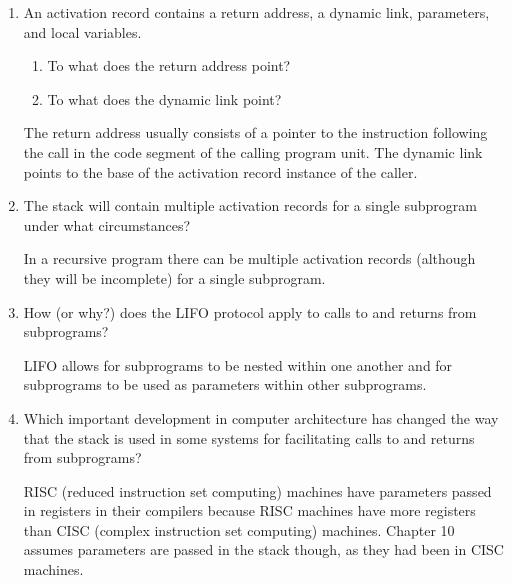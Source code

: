 \begin{enumerate}
\begin{answer}
\end{answer}

  \item An activation record contains a return
    address, a dynamic link, parameters, and
    local variables.
  \begin{enumerate}
    \item To what does the return address point?
    \item To what does the dynamic link point?
    \end{enumerate}
  
  \begin{answer}
  
    The return address usually consists of a pointer to the instruction following the call in the code segment of the calling program unit.  The dynamic link points to the base of the activation record instance of the caller.
    
\end{answer}


  \item The stack will contain multiple activation
    records for a single subprogram under what
    circumstances?
    
\begin{answer}

    In a recursive program there can be multiple activation records (although they will be incomplete) for a single subprogram.
    
\end{answer}


  \item How (or why?) does the LIFO protocol apply to
    calls to and returns from subprograms?
 
 \begin{answer}
 
    LIFO allows for subprograms to be nested within one another and for subprograms to be used as parameters within other subprograms.
    
\end{answer}

  \item Which important development in computer architecture
    has changed the way that the stack is used in some
    systems for facilitating calls to and returns from
    subprograms?

\begin{answer}

    RISC (reduced instruction set computing) machines have parameters passed in registers in their compilers because RISC machines have more registers than CISC (complex instruction set computing) machines. Chapter 10 assumes parameters are passed in the stack though, as they had been in CISC machines.
    

\end{answer}
\end{enumerate}
